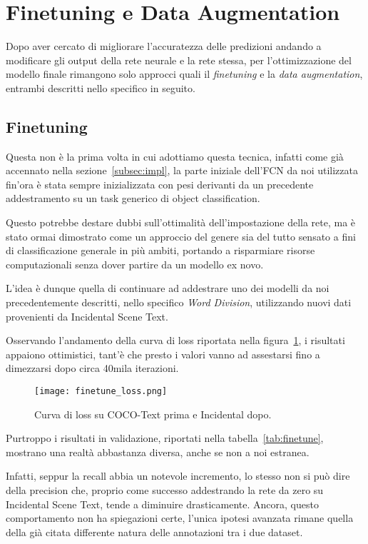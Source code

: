 \section{Finetuning e Data Augmentation}
Dopo aver cercato di migliorare l'accuratezza delle predizioni andando a modificare gli output della rete neurale e la rete stessa, per l'ottimizzazione del modello finale rimangono solo approcci quali il \textit{finetuning} e la \textit{data augmentation}, entrambi descritti nello specifico in seguito.


\subsection{Finetuning}
\label{subsec:train_fine}
Questa non è la prima volta in cui adottiamo questa tecnica, infatti come già accennato nella sezione~\ref{subsec:impl}, la parte iniziale dell'FCN da noi utilizzata fin'ora è stata sempre inizializzata con pesi derivanti da un precedente addestramento su un task generico di object classification.\par
Questo potrebbe destare dubbi sull'ottimalità dell'impostazione della rete, ma è stato ormai dimostrato come un approccio del genere sia del tutto sensato a fini di classificazione generale in più ambiti, portando a risparmiare risorse computazionali senza dover partire da un modello ex novo.\par
L'idea è dunque quella di continuare ad addestrare uno dei modelli da noi precedentemente descritti, nello specifico \textit{Word Division}, utilizzando nuovi dati provenienti da Incidental Scene Text.\par
Osservando l'andamento della curva di loss riportata nella figura~\ref{fig:finetune_loss}, i risultati appaiono ottimistici, tant'è che presto i valori vanno ad assestarsi fino a dimezzarsi dopo circa 40mila iterazioni.

\begin{figure}[H]
	\centering
	\texttt{[image: finetune\_loss.png]}
	\caption{Curva di loss su COCO-Text prima e Incidental dopo.}
\label{fig:finetune_loss}
\end{figure}

\vfill
Purtroppo i risultati in validazione, riportati nella tabella~\ref{tab:finetune}, mostrano una realtà abbastanza diversa, anche se non a noi estranea.\par
Infatti, seppur la recall abbia un notevole incremento, lo stesso non si può dire della precision che, proprio come successo addestrando la rete da zero su Incidental Scene Text, tende a diminuire drasticamente. Ancora, questo comportamento non ha spiegazioni certe, l'unica ipotesi avanzata rimane quella della già citata differente natura delle annotazioni tra i due dataset.
\vfill

